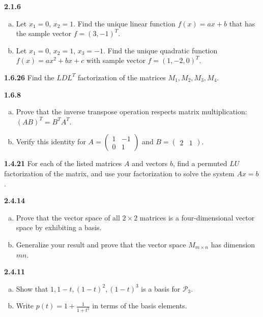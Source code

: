 \documentclass{article}
\begin{document}
\textbf{2.1.6}
\begin{enumerate}[(a)]
    \item Let \(x_1 = 0\), \(x_2 = 1\). Find the unique linear function \(f(x) = ax + b\) that has the sample vector \(f = (3, -1)^T\).
    \item Let \(x_1 = 0\), \(x_2 = 1\), \(x_3 = -1\). Find the unique quadratic function \(f(x) = ax^2 + bx + c\) with sample vector \(f = (1, -2, 0)^T\).
\end{enumerate}
\vspace{10pt}

\textbf{1.6.26}
Find the \(LDL^T\) factorization of the matrices \(M_1, M_2, M_3, M_4\).
\vspace{10pt}

\textbf{1.6.8}
\begin{enumerate}[(a)]
    \item Prove that the inverse transpose operation respects matrix multiplication: \((AB)^T = B^T A^T\).
    \item Verify this identity for \(A = \begin{pmatrix} 1 & -1 \\ 0 & 1 \end{pmatrix}\) and \(B = \begin{pmatrix} 2 & 1 \end{pmatrix}\).
\end{enumerate}
\vspace{10pt}

\textbf{1.4.21}
For each of the listed matrices \(A\) and vectors \(b\), find a permuted \(LU\) factorization of the matrix, and use your factorization to solve the system \(Ax = b\).
\vspace{10pt}

\textbf{2.4.14}
\begin{enumerate}[(a)]
    \item Prove that the vector space of all \(2 \times 2\) matrices is a four-dimensional vector space by exhibiting a basis.
    \item Generalize your result and prove that the vector space \(M_{m \times n}\) has dimension \(mn\).
\end{enumerate}
\vspace{10pt}

\textbf{2.4.11}
\begin{enumerate}[(a)]
    \item Show that \(1, 1 - t, (1 - t)^2, (1 - t)^3\) is a basis for \(\mathcal{P}_3\).
    \item Write \(p(t) = 1 + \frac{1}{1 + t^3}\) in terms of the basis elements.
\end{enumerate}
\vspace{10pt}
\end{document}
